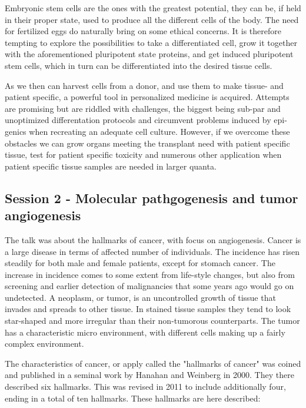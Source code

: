 \documentclass[12p]{article}
\begin{document}
Embryonic stem cells are the ones with the greatest potential, they can be, if held in their proper state, used to produce all the different cells of the body.
The need for fertilized eggs do naturally bring on some ethical concerns.
It is therefore tempting to explore the possibilities to take a differentiated cell, grow it together with the aforementioned pluripotent state proteins, and get induced pluripotent stem cells, which in turn can be differentiated into the desired tissue cells.

As we then can harvest cells from a donor, and use them to make tissue- and patient specific, a powerful tool in personalized medicine is acquired.
Attempts are promising but are riddled with challenges, the biggest being sub-par and unoptimized differentation protocols and circumvent problems induced by epi-genics when recreating an adequate cell culture.
However, if we overcome these obstacles we can grow organs meeting the transplant need with patient specific tissue, test for patient specific toxicity and numerous other application when patient specific tissue samples are needed in larger quanta.

\subsection*{Session 2 - Molecular pathgogenesis and tumor angiogenesis}

The talk was about the hallmarks of cancer, with focus on angiogenesis.
Cancer is a large disease in terms of affected number of individuals.
The incidence has risen steadily for both male and female patients, except for stomach cancer.
The increase in incidence comes to some extent from life-style changes, but also from screening and earlier detection of malignancies that some years ago would go on undetected.
A neoplasm, or tumor, is an uncontrolled growth of tissue that invades and spreads to other tissue.
In stained tissue samples they tend to look star-shaped and more irregular than their non-tumorous counterparts.
The tumor has a characteristic micro environment, with different cells making up a fairly complex environment.

The characteristics of cancer, or apply called the "hallmarks of cancer" was coined and published in a seminal work by Hanahan and Weinberg in 2000.
They there described six hallmarks.
This was revised in 2011 to include additionally four, ending in a total of ten hallmarks.
These hallmarks are here described:
\end{document}
